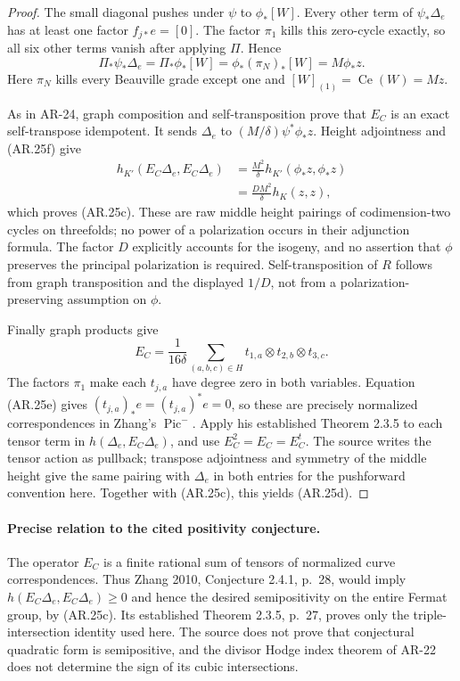 \documentclass[11pt,a4paper]{article}
\begin{document}
\begin{proof}
The small diagonal pushes under $\psi$ to $\phi_*[W]$.  Every
other term of $\psi_*\Delta_e$ has at least one factor
$f_{j*}e=[0]$.  The factor $\pi_1$ kills this zero-cycle exactly,
so all six other terms vanish after applying $\Pi$.  Hence
\[
 \Pi_*\psi_*\Delta_e=\Pi_*\phi_*[W]
      =\phi_*(\pi_N)_*[W]=M\phi_*z.
\]
Here $\pi_N$ kills every Beauville grade except one and
$[W]_{(1)}=\operatorname{Ce}(W)=Mz$.

As in AR-24, graph composition and self-transposition prove that
$E_C$ is an exact self-transpose idempotent.  It sends $\Delta_e$
to $(M/\delta)\psi^*\phi_*z$.  Height adjointness and (AR.25f)
give
\[
 \begin{split}
 h_{K'}(E_C\Delta_e,E_C\Delta_e)
 &=\frac{M^2}{\delta}
       h_{K'}(\phi_*z,\phi_*z)\\
 &=\frac{D M^2}{\delta}h_K(z,z),
 \end{split}
\]
which proves (AR.25c).  These are raw middle height pairings of
codimension-two cycles on threefolds; no power of a polarization
occurs in their adjunction formula.  The factor $D$ explicitly
accounts for the isogeny, and no assertion that $\phi$ preserves
the principal polarization is required.  Self-transposition of
$R$ follows from graph transposition and the displayed $1/D$,
not from a polarization-preserving assumption on $\phi$.

Finally graph products give
\[
 E_C=\frac1{16\delta}\sum_{(a,b,c)\in H}
       t_{1,a}\otimes t_{2,b}\otimes t_{3,c}.            \tag{AR.25g}
\]
The factors $\pi_1$ make each $t_{j,a}$ have degree zero in
both variables.  Equation (AR.25e) gives
$(t_{j,a})_*e=(t_{j,a})^*e=0$, so these are precisely
normalized correspondences in Zhang's $\operatorname{Pic}^{-}$.
Apply his established Theorem 2.3.5 to each tensor term in
$h(\Delta_e,E_C\Delta_e)$, and use $E_C^2=E_C=E_C^t$.
The source writes the tensor action as pullback; transpose
adjointness and symmetry of the middle height give the same
pairing with $\Delta_e$ in both entries for the pushforward
convention here.
Together with (AR.25c), this yields (AR.25d).
\end{proof}

\paragraph{Precise relation to the cited positivity conjecture.}
The operator $E_C$ is a finite rational sum of tensors of normalized
curve correspondences.  Thus Zhang 2010, Conjecture 2.4.1, p.~28,
would imply $h(E_C\Delta_e,E_C\Delta_e)\ge0$ and hence the desired
semipositivity on the entire Fermat group, by (AR.25c).  Its
established Theorem 2.3.5, p.~27, proves only the triple-intersection
identity used here.  The source does not prove that conjectural
quadratic form is semipositive, and the divisor Hodge index theorem
of AR-22 does not determine the sign of its cubic intersections.
\end{document}
